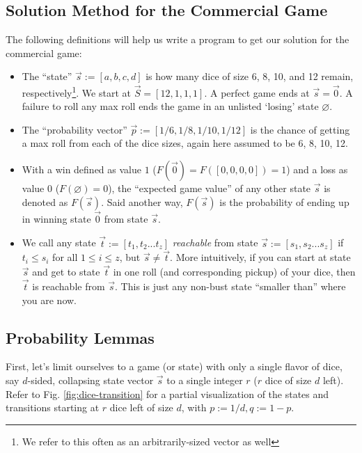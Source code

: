 \documentclass[11pt, oneside]{article} 	%
\begin{document}
\subsection{Solution Method for the Commercial Game}

The following definitions will help us write a program to get our solution for the commercial game:
\begin{itemize}
\item The ``state'' $\vec{s} := [a,b,c,d]$ is how many dice of size 6, 8, 10, and 12 remain, respectively\footnote{We refer to this often as an arbitrarily-sized vector as well}.  We start at $\vec{S} = [12, 1, 1, 1]$.  A perfect game ends at $\vec{s} = \vec{0}$.  A failure to roll any max roll ends the game in an unlisted `losing' state $\varnothing$.
\item The ``probability vector'' $\vec{p} := [1/6, 1/8, 1/10, 1/12]$ is the chance of getting a max roll from each of the dice sizes, again here assumed to be 6, 8, 10, 12.
\item With a win defined as value $1$ ($F(\vec{0}) = F([0,0,0,0]) = 1$) and a loss as value $0$ ($F(\varnothing) = 0$), the ``expected game value'' of any other state $\vec{s}$ is denoted as $F(\vec{s})$.  Said another way, $F(\vec{s})$ is the probability of ending up in winning state $\vec{0}$ from state $\vec{s}$.
\item We call any state $\vec{t} := [t_1,t_2 ... t_z]$  \textit{reachable} from state $\vec{s} := [s_1,s_2 ... s_z]$ if $t_i \leq s_i$ for all $1 \leq i \leq z$, but $\vec{s} \neq \vec{t}$.  More intuitively, if you can start at state $\vec{s}$ and get to state $\vec{t}$ in one roll (and corresponding pickup) of your dice, then $\vec{t}$ is reachable from $\vec{s}$.  This is just any non-bust state ``smaller than'' where you are now.
\end{itemize}

\subsection{Probability Lemmas}
First, let's limit ourselves to a game (or state) with only a single flavor of dice, say $d$-sided, collapsing state vector $\vec{s}$ to a single integer $r$ ($r$ dice of size $d$ left).  Refer to Fig. \ref{fig:dice-transition} for a partial visualization of the states and transitions starting at $r$ dice left of size $d$, with $p := 1/d, q := 1-p$.
\end{document}

